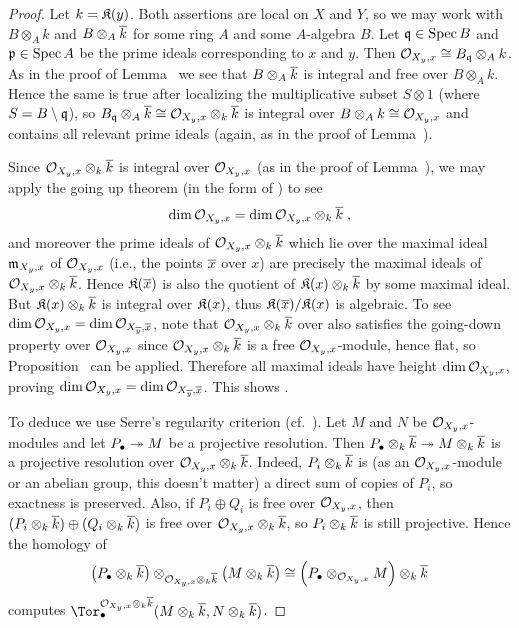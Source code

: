 \documentclass[a4paper,parskip=half,numbers=enddot, DIV=12]{scrreprt}
\begin{document}
\begin{proof}
	Let $k=\mathfrak{K}(y)$. Both assertions are local on $X$ and $Y$, so we may work with $B\otimes_Ak$ and $B\otimes_A\overline{k}$ for some ring $A$ and some $A$-algebra $B$. Let $\mathfrak{q}\in\operatorname{Spec} B$ and $\mathfrak{p}\in\operatorname{Spec} A$ be the prime ideals corresponding to $x$ and $y$. Then $\mathcal{O}_{X_y,x}\cong B_{\mathfrak{q}}\otimes_Ak$. As in the proof of Lemma~ we see that $B\otimes_A\overline{k}$ is integral and free over $B\otimes_Ak$. Hence the same is true after localizing the multiplicative subset $S\otimes 1$ (where $S=B\setminus \mathfrak{q}$), so $B_{\mathfrak{q}}\otimes_A\overline{k}\cong \mathcal{O}_{X_y,x}\otimes_k\overline{k}$ is integral over $B\otimes_Ak\cong \mathcal{O}_{X_y,x}$ and contains all relevant prime ideals (again, as in the proof of Lemma~).
	
	Since $\mathcal{O}_{X_y,x}\otimes_k\overline{k}$ is integral over $\mathcal{O}_{X_y,x}$ (as in the proof of Lemma~), we may apply the going up theorem (in the form of \cite[Theorem~7]{alg1}) to see
	\begin{align*}
		\dim\mathcal{O}_{X_y,x}=\dim\mathcal{O}_{X_y,x}\otimes_k\overline{k}\;,
	\end{align*}
	and moreover the prime ideals of $\mathcal{O}_{X_y,x}\otimes_k\overline{k}$ which lie over the maximal ideal $\mathfrak{m}_{X_y,x}$ of $\mathcal{O}_{X_y,x}$ (i.e., the points $\overline{x}$ over $x$) are precisely the maximal ideals of $\mathcal{O}_{X_y,x}\otimes_k\overline{k}$. Hence $\mathfrak{K}(\overline{x})$ is also the quotient of $\mathfrak{K}(x)\otimes_k\overline{k}$ by some maximal ideal. But $\mathfrak{K}(x)\otimes_k\overline{k}$ is integral over $\mathfrak{K}(x)$, thus $\mathfrak{K}(\overline{x})/\mathfrak{K}(x)$ is algebraic. To see $\dim\mathcal{O}_{X_y,x}=\dim\mathcal{O}_{X_{\overline{y}},\overline{x}}$, note that $\mathcal{O}_{X_y,x}\otimes_k\overline{k}$ over also satisfies the going-down property over $\mathcal{O}_{X_y,x}$ since $\mathcal{O}_{X_y,x}\otimes_k\overline{k}$ is a free $\mathcal{O}_{X_y,x}$-module, hence flat, so Proposition~ can be applied. Therefore all maximal ideals have height $\dim\mathcal{O}_{X_y,x}$, proving $\dim\mathcal{O}_{X_y,x}=\dim\mathcal{O}_{X_{\overline{y}},\overline{x}}$. This shows .
	
	To deduce  we use Serre's regularity criterion (cf.\ \cite[Theorem~1]{homalg}). Let $M$ and $N$ be $\mathcal{O}_{X_y,x}$-modules and let $P_\bullet\epimorphism M$ be a projective resolution. Then $P_\bullet\otimes_k\ov{k}\epimorphism M\otimes_k\ov{k}$ is a projective resolution over $\mathcal{O}_{X_y,x}\otimes_k\overline{k}$. Indeed, $P_i\otimes_k\overline{k}$ is (as an $\mathcal{O}_{X_y,x}$-module or an abelian group, this doesn't matter) a direct sum of copies of $P_i$, so exactness is preserved. Also, if $P_i\oplus Q_i$ is free over $\mathcal{O}_{X_y,x}$, then $(P_i\otimes_k\overline{k})\oplus (Q_i\otimes_k\overline{k})$ is free over $\mathcal{O}_{X_y,x}\otimes_k\overline{k}$, so $P_i\otimes_k\overline{k}$ is still projective. Hence the homology of 
	\begin{align*}
		\left(P_\bullet\otimes_k\overline{k}\right)\otimes_{\mathcal{O}_{X_y,x}\otimes_k\overline{k}}\left(M\otimes_k\overline{k}\right)\cong \left(P_\bullet\otimes_{\mathcal{O}_{X_y,x}}M\right)\otimes_k\overline{k}
	\end{align*}
	computes $\Tor_\bullet^{\Oo_{X_y,x}\otimes_k\ov{k}}(M\otimes_k\ov{k},N\otimes_k\ov{k})$.
	

\end{proof}
\end{document}
